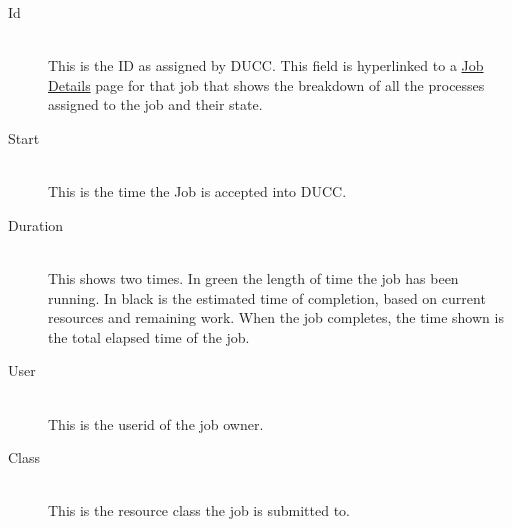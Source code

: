         \begin{description}

            \item[Id] \hfill \\
              This is the ID as assigned by DUCC. This field is hyperlinked to a
              \hyperref[sec:ws-job-details]{Job Details} page for that job that shows the breakdown of
              all the processes assigned to the job and their state.
              
            \item[Start] \hfill \\
              This is the time the Job is accepted into DUCC.
              
            \item[Duration] \hfill \\
              This shows two times.  In green the length of time the job has been running.  In black is
              the estimated time of completion, based on current resources and remaining work.  When
              the job completes, the time shown is the total elapsed time of the job.
                            
            \item[User] \hfill \\
              This is the userid of the job owner.
              
            \item[Class] \hfill \\
              This is the resource class the job is submitted to.
              

\end{description}
